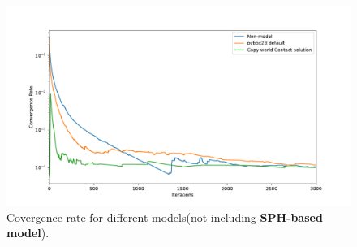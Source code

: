     \begin{figure}[!ht]
        \centering
        \includegraphics[scale = 0.4]{Figures/nosph}
        \caption{Covergence rate for different models(not including \textbf{SPH-based model}).}
        \label{fg:nosph}
    \end{figure}

